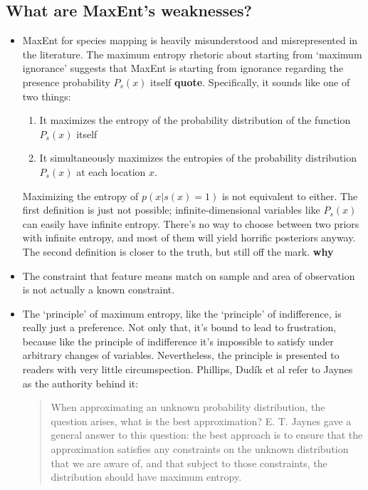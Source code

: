 \subsection{What are MaxEnt's weaknesses?}

\label{sec:weaknesses}

\begin{itemize}
    \item MaxEnt for species mapping is heavily misunderstood and misrepresented in the literature. The maximum entropy rhetoric about starting from `maximum ignorance' suggests that MaxEnt is starting from ignorance regarding the presence probability $P_s(x)$ itself \textbf{quote}. Specifically, it sounds like one of two things:
    \begin{enumerate}
        \item It maximizes the entropy of the probability distribution of the function $P_s(x)$ itself
        \item It simultaneously maximizes the entropies of the probability distribution $P_s(x)$ at each location $x$.
    \end{enumerate}
    Maximizing the entropy of $p(x|s(x)=1)$ is not equivalent to either. The first definition is just not possible; infinite-dimensional variables like $P_s(x)$ can easily have infinite entropy. There's no way to choose between two priors with infinite entropy, and most of them will yield horrific posteriors anyway. The second definition is closer to the truth, but still off the mark. \textbf{why}
    \item The constraint that feature means match on sample and area of observation is not actually a known constraint.
    \item The `principle' of maximum entropy, like the `principle' of indifference, is really just a preference. Not only that, it's bound to lead to frustration, because like the principle of indifference it's impossible to satisfy under arbitrary changes of variables. Nevertheless, the principle is presented to readers with very little circumspection. Phillips, Dud\'ik et al \cite{Phillips:2004p11403,Phillips:2006p11404,Phillips:2008p12219} refer to Jaynes \cite{Jaynes:ch11} as the authority behind it:
    \begin{quote}
        When approximating an unknown probability distribution, the question arises, what is the best approximation? E. T. Jaynes gave a general answer to this question: the best approach is to ensure that the approximation satisfies any constraints on the unknown distribution that we are aware of, and that subject to those constraints, the distribution should have maximum entropy.

\end{quote}
\end{itemize}

